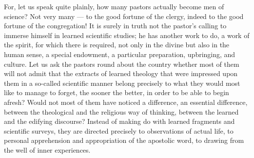 \documentclass[12pt]{book}
\begin{document}
For, let us speak quite plainly, how many pastors actually become men of
science? Not very many --- to the good fortune of the clergy, indeed to
the good fortune of the congregation! It is surely in truth not the
pastor's calling to immerse himself in learned scientific studies; he has
another work to do, a work of the spirit, for which there is required, not
only in the divine but also in the human sense, a special endowment, a
particular preparation, upbringing, and culture. Let us ask the pastors
round about the country whether most of them will not admit that the
extracts of learned theology that were impressed upon them in a so-called
scientific manner belong precisely to what they would most like to manage
to forget, the sooner the better, in order to be able to begin afresh?
Would not most of them have noticed a difference, an essential difference,
between the theological and the religious way of thinking, between the
learned and the edifying discourse? Instead of making do with learned
fragments and scientific surveys, they are directed precisely to
observations of actual life, to personal apprehension and appropriation of
the apostolic word, to drawing from the well of inner experiences.
\end{document}
